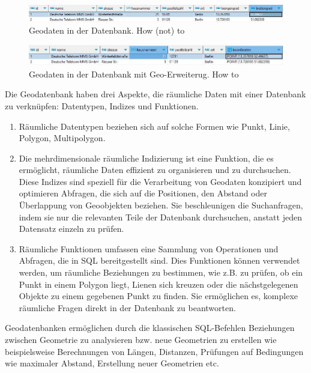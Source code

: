 \begin{figure}[ht]
  \centering
  \includegraphics[width=\linewidth]{images/einfacheDB.jpg}
  \caption{Geodaten in der Datenbank. How (not) to}
  \label{fig:meineabbildung}
\end{figure}
\begin{figure}[ht]
  \centering
  \includegraphics[width=\linewidth]{images/geoDB.jpg}
  \caption{Geodaten in der Datenbank mit Geo-Erweiterug. How to}
  \label{fig:meineabbildung}
\end{figure}
 Die Geodatenbank haben drei Aspekte, die räumliche Daten mit einer Datenbank zu verknüpfen: Datentypen, Indizes und Funktionen.
\begin{enumerate}
    \item Räumliche Datentypen beziehen sich auf solche Formen wie Punkt, Linie, Polygon, Multipolygon.
    \item Die mehrdimensionale räumliche Indizierung ist eine Funktion, die es ermöglicht, räumliche Daten effizient zu organisieren und zu durchsuchen. Diese Indizes sind speziell für die Verarbeitung von Geodaten konzipiert und optimieren Abfragen, die sich auf die Positionen, den Abstand oder Überlappung von Geoobjekten beziehen. Sie beschleunigen die Suchanfragen, indem sie nur die relevanten Teile der Datenbank durchsuchen, anstatt jeden Datensatz einzeln zu prüfen.
    \item Räumliche Funktionen umfassen eine Sammlung von Operationen und Abfragen, die in SQL bereitgestellt sind. Dies Funktionen können verwendet werden, um räumliche Beziehungen zu bestimmen, wie z.B. zu prüfen, ob ein Punkt in einem Polygon liegt, Lienen sich kreuzen oder die nächstgelegenen Objekte zu einem gegebenen Punkt zu finden. Sie ermöglichen es, komplexe räumliche Fragen direkt in der Datenbank zu beantworten. 
\end{enumerate}

Geodatenbanken ermöglichen durch die klassischen SQL-Befehlen Beziehungen zwischen Geometrie zu analysieren bzw. neue Geometrien zu erstellen wie beispielsweise Berechnungen von Längen, Distanzen, Prüfungen auf Bedingungen wie maximaler Abstand, Erstellung neuer Geometrien etc.
